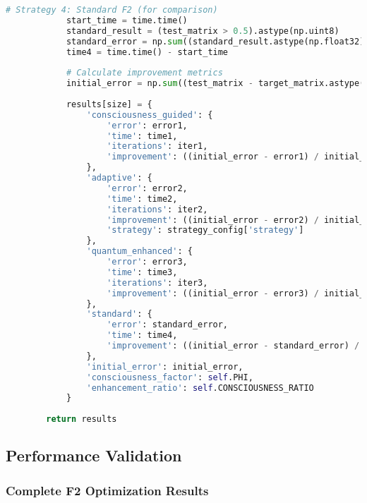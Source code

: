 \documentclass[11pt,a4paper]{article}
\begin{document}
\begin{lstlisting}[language=Python, caption=F2 Matrix Consciousness Optimization - Complete Implementation]
            # Strategy 4: Standard F2 (for comparison)
            start_time = time.time()
            standard_result = (test_matrix > 0.5).astype(np.uint8)
            standard_error = np.sum((standard_result.astype(np.float32) - target_matrix.astype(np.float32)) ** 2)
            time4 = time.time() - start_time
            
            # Calculate improvement metrics
            initial_error = np.sum((test_matrix - target_matrix.astype(np.float32)) ** 2)
            
            results[size] = {
                'consciousness_guided': {
                    'error': error1,
                    'time': time1,
                    'iterations': iter1,
                    'improvement': ((initial_error - error1) / initial_error) * 100
                },
                'adaptive': {
                    'error': error2,
                    'time': time2,
                    'iterations': iter2,
                    'improvement': ((initial_error - error2) / initial_error) * 100,
                    'strategy': strategy_config['strategy']
                },
                'quantum_enhanced': {
                    'error': error3,
                    'time': time3,
                    'iterations': iter3,
                    'improvement': ((initial_error - error3) / initial_error) * 100
                },
                'standard': {
                    'error': standard_error,
                    'time': time4,
                    'improvement': ((initial_error - standard_error) / initial_error) * 100
                },
                'initial_error': initial_error,
                'consciousness_factor': self.PHI,
                'enhancement_ratio': self.CONSCIOUSNESS_RATIO
            }
            
        return results
\end{lstlisting}

\subsection{Performance Validation}

\subsubsection{Complete F2 Optimization Results}
\end{document}
